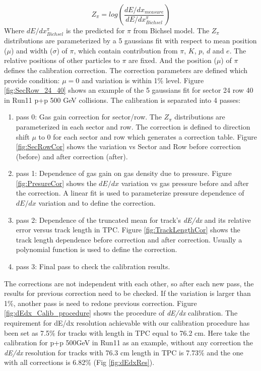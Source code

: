 \begin{equation}
Z_{\pi}=log\left(\frac{dE/dx_{measure}}{dE/dx_{Bichsel}^{\pi}}\right)\label{eq:Zpi}
\end{equation}
Where $dE/dx_{Bichsel}^{\pi}$ is the predicted for $\pi$ from Bichsel
model. The \emph{$Z_{\pi}$ }distributions are parameterized by a
5 gaussians fit with respect to mean position ($\mu$) and width ($\sigma$)
of $\pi$, which contain contribution from $\pi$, $K$, $p$, $d$
and $e$. The relative positions of other particles to $\pi$ are
fixed. And the position ($\mu$) of $\pi$ defines the calibration
correction. The correction parameters are defined which provide condition:
$\mu=0$ and variation is within 1\% level. Figure \ref{fig:SecRow_24_40}
shows an example of the 5 gaussians fit for sector 24 row 40 in Run11
p+p 500 GeV collisions. The calibration is separated into 4 passes:
\begin{enumerate}
\item pass 0: Gas gain correction for sector/row. The $Z_{\pi}$ distributions
are parameterized in each sector and row. The correction is defined
to direction shift $\mu$ to 0 for each sector and row which generates
a correction table. Figure \ref{fig:SecRowCor} shows the variation
vs Sector and Row before correction (before) and after correction
(after).
\item pass 1: Dependence of gas gain on gas density due to pressure. Figure
\ref{fig:PresureCor} shows the $dE/dx$ variation vs gas pressure
before and after the correction. A linear fit is used to parameterize
pressure dependence of $dE/dx$ variation and to define the correction.
\item pass 2: Dependence of the truncated mean for track's \emph{dE/dx}
and its relative error versus track length in TPC. Figure \ref{fig:TrackLengthCor}
shows the track length dependence before correction and after correction.
Usually a polynomial function is used to define the correction.
\item pass 3: Final pass to check the calibration results.
\end{enumerate}
The corrections are not independent with each other, so after each
new pass, the results for previous correction need to be checked.
If the variation is larger than 1\%, another pass is need to redone
previous correction. Figure \ref{fig:dEdx_Calib_procedure} shows
the procedure of \emph{dE/dx }calibration. The requirement for dE/dx
resolution achievable with our calibration procedure has been set
as 7.5\% for tracks with length in TPC equal to 76.2 cm. Here take
the calibration for p+p 500GeV in Run11 as an example, without any
correction the \emph{dE/dx} resolution for tracks with 76.3 cm length
in TPC is 7.73\% and the one with all corrections is 6.82\% (Fig \ref{fig:dEdxRes}).


